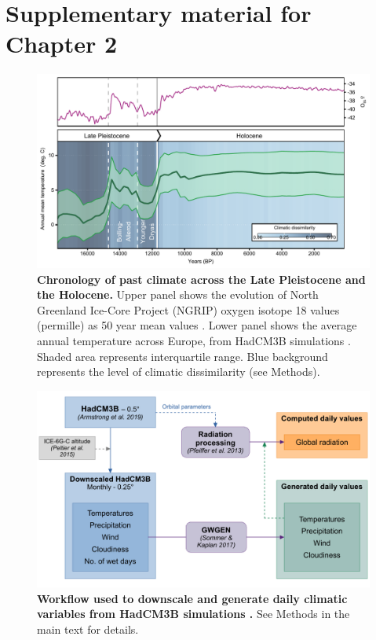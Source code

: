 
\section{Supplementary material for Chapter 2}

\vspace*{1cm}

\begin{figure}
\hspace*{-0.5in}
\centering
\includegraphics{chapter2/figs/supp/figS1_climate_overview-1.pdf}
\caption{\textbf{Chronology of past climate across the Late Pleistocene and the Holocene.} Upper panel shows the evolution of North Greenland Ice-Core Project (NGRIP) oxygen isotope 18 values (permille) as 50 year mean values \cite{Andersen2004}. Lower panel shows the average annual temperature across Europe, from HadCM3B simulations \cite{Armstrong2019}. Shaded area  represents interquartile range. Blue background represents the level of climatic dissimilarity (see Methods).}
\label{fig:S1}
\end{figure}

\begin{figure}
\hspace*{-0.5in}
\centering
\includegraphics{chapter2/figs/supp/paleoclimate_processing.pdf}
\caption{\textbf{Workflow used to downscale and generate daily climatic variables from HadCM3B simulations \citep{Armstrong2019}.} See Methods in the main text for details.}
\label{fig:workflow}
\end{figure}


